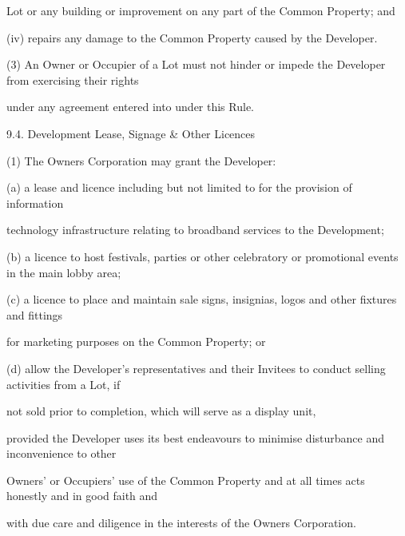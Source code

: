 \documentclass{article}
\begin{document}
{\fontsize{10.02}{1}Lot or any building or improvement on any part of the Common Property; and }

{\fontsize{9.962}{1}(iv) repairs any damage to the Common Property caused by the Developer. }

{\fontsize{9.962}{1}(3) An Owner or Occupier of a Lot must not hinder or impede the Developer from exercising their rights }

{\fontsize{10.02}{1}under any agreement entered into under this Rule. }

{\fontsize{9.99}{1}9.4. Development Lease, Signage \& Other Licences }

{\fontsize{9.962}{1}(1) The Owners Corporation may grant the Developer: }

{\fontsize{9.962}{1}(a) a lease and licence including but not limited to for the provision of information }

{\fontsize{10.02}{1}technology infrastructure relating to broadband services to the Development; }

{\fontsize{9.962}{1}(b) a licence to host festivals, parties or other celebratory or promotional events in the main lobby area; }

{\fontsize{9.962}{1}(c) a licence to place and maintain sale signs, insignias, logos and other fixtures and fittings }

{\fontsize{10.02}{1}for marketing purposes on the Common Property; or }

\newpage


















{\fontsize{9.962}{1}(d) allow the Developer's representatives and their Invitees to conduct selling activities from a Lot, if }

{\fontsize{10.02}{1}not sold prior to completion, which will serve as a display unit, }

{\fontsize{10.02}{1}provided the Developer uses its best endeavours to minimise disturbance and inconvenience to other }

{\fontsize{10.02}{1}Owners' or Occupiers' use of the Common Property and at all times acts honestly and in good faith and }

{\fontsize{10.02}{1}with due care and diligence in the interests of the Owners Corporation. }
\end{document}
